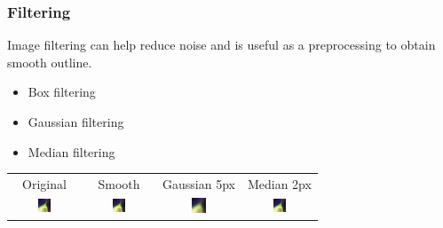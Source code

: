 \documentclass[ignorenonframetext,aspectratio=169,10pt,xcolor=table]{beamer}
\begin{document}
\begin{frame} \frametitle{Filtering}

  Image filtering can help reduce noise and is useful as a preprocessing to
  obtain smooth outline.

  \begin{itemize}
  \item Box filtering 
  \item Gaussian filtering 
  \item Median filtering 
  \end{itemize}
  \begin{center}
    \begin{tabular}{ c c c c}
      Original & Smooth & Gaussian 5px  & Median 2px\\
      \includegraphics[width=0.2\textwidth]{flt-original}&
      \includegraphics[width=0.2\textwidth]{flt-smooth}&
      \includegraphics[width=0.2\textwidth]{flt-gaussian5}&
      \includegraphics[width=0.2\textwidth]{flt-median2}
    \end{tabular}
    \end{center}

\end{frame}
\end{document}
